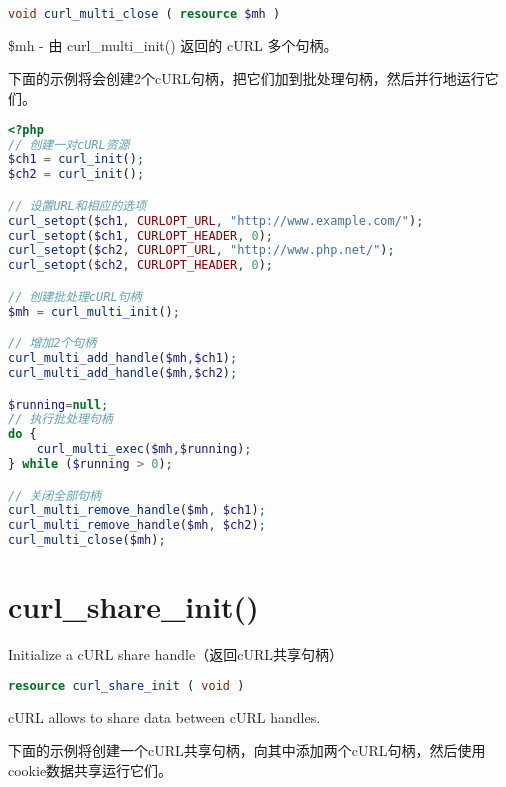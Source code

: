 \begin{lstlisting}[language=PHP]
void curl_multi_close ( resource $mh )
\end{lstlisting}

\begin{compactitem}
\item \$mh - 由 curl\_multi\_init() 返回的 cURL 多个句柄。
\end{compactitem}

下面的示例将会创建2个cURL句柄，把它们加到批处理句柄，然后并行地运行它们。

\begin{lstlisting}[language=PHP]
<?php
// 创建一对cURL资源
$ch1 = curl_init();
$ch2 = curl_init();

// 设置URL和相应的选项
curl_setopt($ch1, CURLOPT_URL, "http://www.example.com/");
curl_setopt($ch1, CURLOPT_HEADER, 0);
curl_setopt($ch2, CURLOPT_URL, "http://www.php.net/");
curl_setopt($ch2, CURLOPT_HEADER, 0);

// 创建批处理cURL句柄
$mh = curl_multi_init();

// 增加2个句柄
curl_multi_add_handle($mh,$ch1);
curl_multi_add_handle($mh,$ch2);

$running=null;
// 执行批处理句柄
do {
    curl_multi_exec($mh,$running);
} while ($running > 0);

// 关闭全部句柄
curl_multi_remove_handle($mh, $ch1);
curl_multi_remove_handle($mh, $ch2);
curl_multi_close($mh);
\end{lstlisting}

\section{curl\_share\_init()}

Initialize a cURL share handle（返回cURL共享句柄）

\begin{lstlisting}[language=PHP]
resource curl_share_init ( void )
\end{lstlisting}

cURL allows to share data between cURL handles.

下面的示例将创建一个cURL共享句柄，向其中添加两个cURL句柄，然后使用cookie数据共享运行它们。

